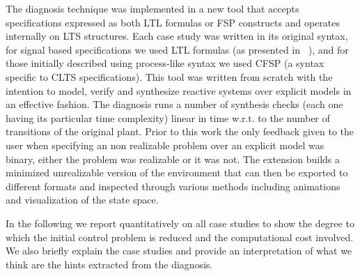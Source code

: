 \vspace{-1em}
The diagnosis technique was implemented in a new tool that accepts specifications expressed as both LTL formulas or FSP constructs and operates internally on LTS structures. Each case study was written in its original syntax, for signal based specifications we used LTL formulas (as presented in ~\cite{Bloem:2012}), and for those initially described using process-like syntax we used CFSP (a syntax specific to CLTS specifications). This tool was written from scratch with the intention to model, verify and synthesize reactive systems over explicit models in an effective fashion. 
The diagnosis runs a number of synthesis checks (each one having its particular time complexity) linear in time w.r.t. to the number of transitions of the original plant.
Prior to this work the only feedback given to the user  when specifying an non realizable problem over an explicit model was binary, either the problem was realizable or it was not.
The extension builds a minimized unrealizable version of the environment that can then be exported to different formats and inspected through various methods including animations and visualization of the state space.

In the following we report quantitatively on all case studies to show the degree to which the initial control problem is reduced and the computational cost involved. We also briefly explain the case studies and provide an interpretation of what we think are the hints extracted from the diagnosis. 

